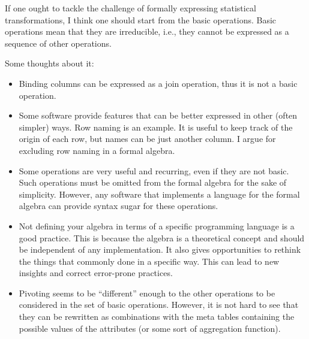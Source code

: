 If one ought to tackle the challenge of formally expressing statistical transformations, I
think one should start from the basic operations.  Basic operations mean that they are
irreducible, i.e., they cannot be expressed as a sequence of other operations.

Some thoughts about it:
\begin{itemize}
  \item Binding columns can be expressed as a join operation, thus it is not a basic
    operation.
  \item Some software provide features that can be better expressed in other (often simpler) ways.  Row
    naming is an example.  It is useful to keep track of the origin of each row, but names
    can be just another column.  I argue for excluding row naming in a formal algebra.
  \item Some operations are very useful and recurring, even if they are not basic.  Such
    operations must be omitted from the formal algebra for the sake of simplicity.
    However, any software that implements a language for the formal algebra can provide
    syntax sugar for these operations.
  \item Not defining your algebra in terms of a specific programming language is a good
    practice.  This is because the algebra is a theoretical concept and should be
    independent of any implementation.  It also gives opportunities to rethink the
    things that commonly done in a specific way.  This can lead to new insights and
    correct error-prone practices.
  \item Pivoting seems to be ``different'' enough to the other operations to be considered
    in the set of basic operations.  However, it is not hard to see that they can be
    rewritten as combinations with the meta tables containing the possible values of the
    attributes (or some sort of aggregation function).
\end{itemize}

